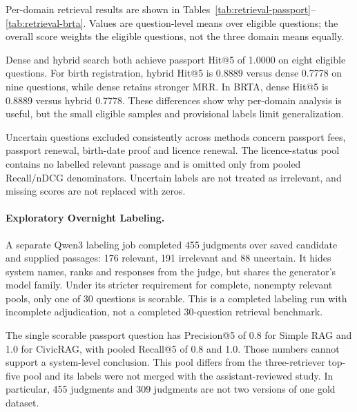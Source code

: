 Per-domain retrieval results are shown in Tables~\ref{tab:retrieval-passport}--\ref{tab:retrieval-brta}. Values are question-level means over eligible questions; the overall score weights the eligible questions, not the three domain means equally.



Dense and hybrid search both achieve passport Hit@5 of 1.0000 on eight eligible questions. For birth registration, hybrid Hit@5 is 0.8889 versus dense 0.7778 on nine questions, while dense retains stronger MRR. In BRTA, dense Hit@5 is 0.8889 versus hybrid 0.7778. These differences show why per-domain analysis is useful, but the small eligible samples and provisional labels limit generalization.

Uncertain questions excluded consistently across methods concern passport fees, passport renewal, birth-date proof and licence renewal. The licence-status pool contains no labelled relevant passage and is omitted only from pooled Recall/nDCG denominators. Uncertain labels are not treated as irrelevant, and missing scores are not replaced with zeros.

\paragraph{Exploratory Overnight Labeling.}
A separate Qwen3 labeling job completed 455 judgments over saved candidate and supplied passages: 176 relevant, 191 irrelevant and 88 uncertain. It hides system names, ranks and responses from the judge, but shares the generator's model family. Under its stricter requirement for complete, nonempty relevant pools, only one of 30 questions is scorable. This is a completed labeling run with incomplete adjudication, not a completed 30-question retrieval benchmark.

The single scorable passport question has Precision@5 of 0.8 for Simple RAG and 1.0 for CivicRAG, with pooled Recall@5 of 0.8 and 1.0. Those numbers cannot support a system-level conclusion. This pool differs from the three-retriever top-five pool and its labels were not merged with the assistant-reviewed study. In particular, 455 judgments and 309 judgments are not two versions of one gold dataset.

